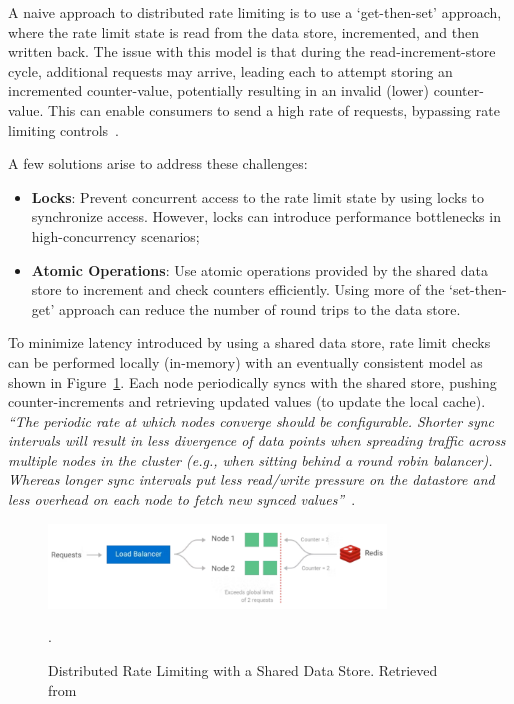 A naive approach to distributed rate limiting is to use a `get-then-set' approach,
where the rate limit state is read from the data store, incremented, and then written back.
The issue with this model is that during the read-increment-store cycle, additional requests may arrive, leading each to attempt storing an incremented counter-value, potentially resulting in an invalid (lower) counter-value.
This can enable consumers to send a high rate of requests, bypassing rate limiting controls~\cite{kong-rate-limiting}.

A few solutions arise to address these challenges:

\begin{itemize}
    \item \textbf{Locks}: Prevent concurrent access to the rate limit state by using locks to synchronize access.
    However, locks can introduce performance bottlenecks in high-concurrency scenarios;
    \item \textbf{Atomic Operations}:
    Use atomic operations provided by the shared data store to increment and check counters efficiently.
    Using more of the `set-then-get' approach can reduce the number of round trips to the data store.
\end{itemize}

To minimize latency introduced by using a shared data store,
rate limit checks can be performed locally (in-memory) with an eventually consistent model as shown in Figure~\ref{fig:distributed-rate-limiting-shared}.
Each node periodically syncs with the shared store,
pushing counter-increments and retrieving updated values (to update the local cache).
\textit{\enquote{The periodic rate at which nodes converge should be configurable. Shorter sync intervals will result in less divergence of data points when spreading traffic across multiple nodes in the cluster (e.g., when sitting behind a round robin balancer). Whereas longer sync intervals put less read/write pressure on the datastore and less overhead on each node to fetch new synced values}}~\cite{kong-rate-limiting}.

\begin{figure}[!htb]
    \centering
    \includegraphics[width=0.8\textwidth]{../figures/06_distributed_rate_limiting}
    \caption{Distributed Rate Limiting with a Shared Data Store.
    Retrieved from~\cite{kong-rate-limiting}}.
    \label{fig:distributed-rate-limiting-shared}
\end{figure}


